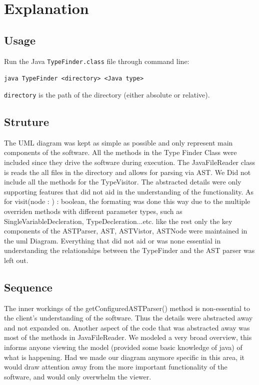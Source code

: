 \documentclass[12p]{article}
\newcommand{\code}[1]{\texttt{#1}}
\begin{document}
\newpage
\onehalfspacing
\section{Explanation}

\subsection{Usage}
Run the Java \code{TypeFinder.class} file through command line:

\code{java TypeFinder <directory> <Java type>}

\code{directory} is the path of the directory (either absolute or relative).

\subsection{Struture}
The UML diagram was kept as simple as possible and only represent main components of the software. All the methods in the Type Finder Class were included since they drive the software during execution. The JavaFileReader class is reads the all files in the directory and allows for parsing via AST. We Did not include all the methods for the TypeVisitor. The abstracted details were only supporting features that did not aid in the understanding of the functionality. As for visit(node : ) : boolean, the formating was done this way due to the multiple overriden methods with different parameter types, such as SingleVariableDecleration, TypeDecleration...etc.
like the rest only the key components of  the ASTParser, AST, ASTVistor, ASTNode were maintained in the uml Diagram. Everything that did not aid or was none essential in understanding the relationships between the TypeFinder and the AST parser was left out.

\subsection{Sequence}
The inner workings of the getConfiguredASTParser() method is non-essential to the client's understanding of the software. Thus the details were abstracted away and not expanded on. Another aspect of the code that was abstracted away was most of the methods in JavaFileReader. We modeled a very broad overview, this informs anyone viewing the model (provided some basic knowledge of java) of what is happening. Had we made our diagram anymore specific in this area, it would draw attention away from the more important functionality of the software, and would only overwhelm the viewer.
\end{document}
